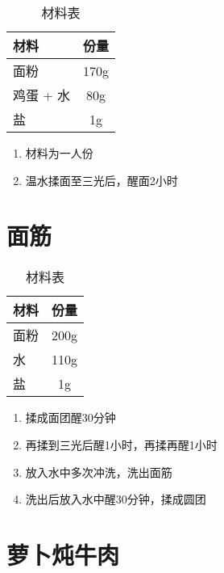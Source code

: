 \begin{table}[H]
    \centering
    \begin{tabular}{|l||c|}\hline
     \textbf{材料}    &  \textbf{份量}\\ \hline\hline
    面粉 & 170g \\ \hline
    鸡蛋 + 水 &  80g \\ \hline
    盐 & 1g \\ \hline
    \end{tabular}
    \caption{材料表}
\end{table}

\begin{enumerate}
    \item 材料为一人份
    \item 温水揉面至三光后，醒面2小时
\end{enumerate}


\section{面筋}

\begin{table}[H]
    \centering
    \begin{tabular}{|l||c|}\hline
     \textbf{材料}    &  \textbf{份量}\\ \hline\hline
    面粉 & 200g \\ \hline
    水 &  110g \\ \hline
    盐 & 1g  \\ \hline
    \end{tabular}
    \caption{材料表}
\end{table}

\begin{enumerate}
    \item  揉成面团醒30分钟
    \item 再揉到三光后醒1小时，再揉再醒1小时
    \item 放入水中多次冲洗，洗出面筋
    \item 洗出后放入水中醒30分钟，揉成圆团
\end{enumerate}


\section{萝卜炖牛肉}

